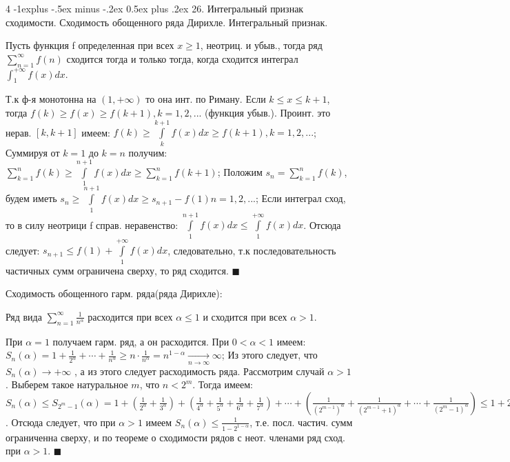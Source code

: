 \documentclass[unicode,10pt, landscape]{article}
\makeatletter
\renewcommand{\subsection}{\@startsection{subsection}{2}{0mm}%
                                {-1explus -.5ex minus -.2ex}%
                                {0.5ex plus .2ex}%
                                {\normalfont\normalsize\bfseries}}
\newenvironment{Proof} %
{\par\noindent{\bf Док-во:}} %
{\hfill$\scriptstyle\blacksquare$}
\makeatother
\begin{document}
\begin{multicols}{4}
 \subsection{26. Интегральный признак сходимости. Сходимость обощенного ряда Дирихле.}
 Интегральный признак.
 \begin{Th}
  Пусть функция f определенная при всех $x\geq1$, неотриц. и убыв., тогда ряд $\sum_{n=1}^{\infty}f(n)$ сходится тогда и только тогда, когда сходится интеграл $\int_{1}^{+\infty}{f(x)dx}$.
  \begin{Proof}
   Т.к ф-я монотонна на $(1, +\infty)$ то она инт. по Риману. Если $k\leq x\leq k+1$, тогда $f(k)\geq f(x)\geq f(k+1), k=1,2, ...$ (функция убыв.). Проинт. это нерав. $ \left[k,k+1\right]$ имеем: $f(k)\geq \int\limits_{k}^{k+1}{f(x)dx}\geq f(k+1), k=1,2, ...$; Суммируя от $k=1$ до $k=n$ получим: $\sum\limits_{k=1}^{n}{f(k)}\geq \int\limits_{1}^{n+1}{f(x)dx}\geq \sum\limits_{k=1}^{n}{f(k+1)}$; Положим $s_{n}=\sum_{k=1}^{n}{f(k)}$, будем иметь $s_{n}\geq \int\limits_{1}^{n+1}{f(x)dx}\geq s_{n+1}-f(1)
    n=1,2, ...$; Если интеграл сход, то в силу неотрици f справ. неравенство: $\int\limits_{1}^{n+1}{f(x)dx}\leq \int\limits_{1}^{+\infty}{f(x)dx}$. Отсюда следует: $s_{n+1}\leq f(1)+\int\limits_{1}^{+\infty}{f(x)dx}$, следовательно, т.к последовательность частичных сумм ограничена сверху, то ряд сходится.
  \end{Proof}
 \end{Th}

 Сходимость обощенного гарм. ряда(ряда Дирихле):
 \begin{Th}
  Ряд вида $\sum_{n = 1}^{\infty}\frac{1}{n^\alpha}$ расходится при всех $\alpha \leq 1$ и сходится при всех $\alpha > 1$.
  \begin{Proof}
   При $\alpha=1$ получаем гарм. ряд, а он расходится. При $0<\alpha<1$ имеем: $S_{n}(\alpha)=1+ \frac{1}{2^{\alpha}}+\cdots +\frac{1}{n^{\alpha}}\geq n \cdot \frac{1}{n^{\alpha}}=n^{1-\alpha}\underset{n\rightarrow \infty }{\rightarrow}\infty$; Из этого следует, что $S_{n}(\alpha)\rightarrow +\infty$ , а из этого следует расходимость ряда. Рассмотрим случай $\alpha>1$. Выберем такое натуральное $m$, что $n<2^{m}$. Тогда имеем: $S_{n}(\alpha)\leq S_{2^{m}-1}(\alpha)=1+\left ( \frac{1}{2^{\alpha}}+\frac{1}{3^{\alpha}} \right )+\left ( \frac{1}{4^{\alpha}}+\frac{1}{5^{\alpha}}+\frac{1}{6^{\alpha}}+\frac{1}{7^{\alpha}} \right )+ \cdots +\left ( \frac{1}{(2^{m-1})^{\alpha}}+\frac{1}{(2^{m-1}+1)^{\alpha}}+\cdots +\frac{1}{(2^{m}-1)^{\alpha}} \right )\leq 1+2^{1-\alpha}+(2^{2})^{1-\alpha}+\cdots +(2^{m-1})^{1-\alpha}=1+2^{1-\alpha}+(2^{1-\alpha})^{2}+\cdots +(2^{1-\alpha})^{m-1}=\frac{1-(2^{1-\alpha})^{m}}{1-2^{1-\alpha}}$. Отсюда следует, что при $\alpha>1$ имеем $S_{n}(\alpha)\leq \frac{1}{1-2^{1-\alpha}}$, т.е. посл. частич. сумм ограниченна сверху, и по теореме о сходимости рядов с неот. членами ряд сход. при $\alpha>1$.
  \end{Proof}
 \end{Th}


\end{multicols}
\end{document}
